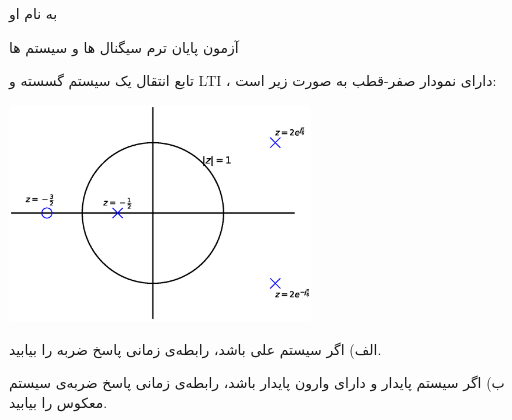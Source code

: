 \documentclass{article}
\begin{document}
\begin{center}
\large

به نام او

آزمون پایان ترم سیگنال ها و سیستم ها
\end{center}

\hrulefill

\large



تابع انتقال یک سیستم گسسته و LTI ، دارای نمودار صفر-قطب به صورت زیر است:

\begin{center}
\includegraphics[width=80mm]{final_inv.eps}
\end{center}

الف) اگر سیستم علی باشد، رابطه‌ی زمانی پاسخ ضربه را بیابید.

ب) اگر سیستم پایدار و دارای وارون پایدار باشد، رابطه‌ی زمانی پاسخ ضربه‌ی سیستم معکوس را بیابید.
\end{document}
